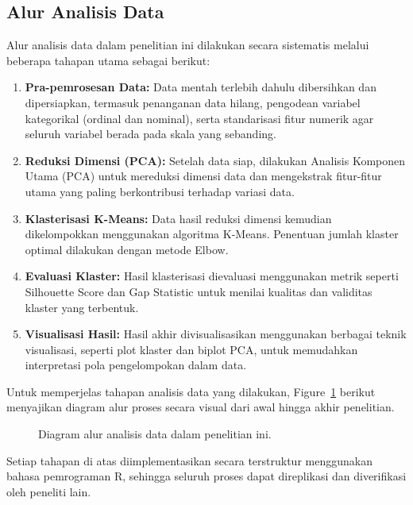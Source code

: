 \subsection{Alur Analisis Data}

Alur analisis data dalam penelitian ini dilakukan secara sistematis melalui beberapa tahapan utama sebagai berikut:

\begin{enumerate}
	\item \textbf{Pra-pemrosesan Data:} Data mentah terlebih dahulu dibersihkan dan dipersiapkan, termasuk penanganan data hilang, pengodean variabel kategorikal (ordinal dan nominal), serta standarisasi fitur numerik agar seluruh variabel berada pada skala yang sebanding.
	\item \textbf{Reduksi Dimensi (PCA):} Setelah data siap, dilakukan Analisis Komponen Utama (PCA) untuk mereduksi dimensi data dan mengekstrak fitur-fitur utama yang paling berkontribusi terhadap variasi data.
	\item \textbf{Klasterisasi K-Means:} Data hasil reduksi dimensi kemudian dikelompokkan menggunakan algoritma K-Means. Penentuan jumlah klaster optimal dilakukan dengan metode Elbow.
	\item \textbf{Evaluasi Klaster:} Hasil klasterisasi dievaluasi menggunakan metrik seperti Silhouette Score dan Gap Statistic untuk menilai kualitas dan validitas klaster yang terbentuk.
	\item \textbf{Visualisasi Hasil:} Hasil akhir divisualisasikan menggunakan berbagai teknik visualisasi, seperti plot klaster dan biplot PCA, untuk memudahkan interpretasi pola pengelompokan dalam data.
\end{enumerate}

Untuk memperjelas tahapan analisis data yang dilakukan, Figure~\ref{fig:alur} berikut menyajikan diagram alur proses secara visual dari awal hingga akhir penelitian.

\begin{figure}[h]
	\centering
	\resizebox{0.4\linewidth}{!}{}
	\caption{Diagram alur analisis data dalam penelitian ini.}\label{fig:alur}
\end{figure}

Setiap tahapan di atas diimplementasikan secara terstruktur menggunakan bahasa pemrograman R, sehingga seluruh proses dapat direplikasi dan diverifikasi oleh peneliti lain.

